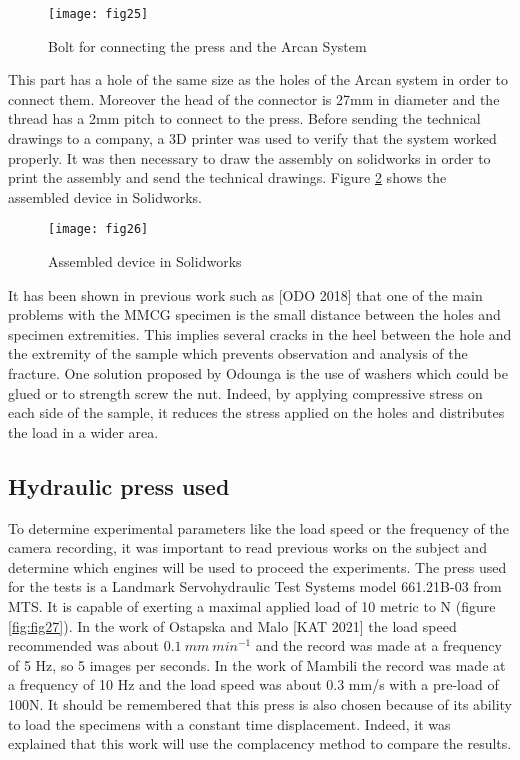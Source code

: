 \graphicspath{{Images/}}
\begin{figure}[htp]
	\centering
	\texttt{[image: fig25]}
	\caption{Bolt for connecting the press and the Arcan System}
	\label{fig:fig25}
\end{figure}

This part has a hole of the same size as the holes of the Arcan system in order to connect them. Moreover the head of the connector is 27mm in diameter and the thread has a 2mm pitch to connect to the press. Before sending the technical drawings to a company, a 3D printer was used to verify that the system worked properly. It was then necessary to draw the assembly on solidworks in order to print the assembly and send the technical drawings. Figure \ref{fig:fig26} shows the assembled device in Solidworks.

\graphicspath{{Images/}}
\begin{figure}[htp]
	\centering
	\texttt{[image: fig26]}
	\caption{Assembled device in Solidworks}
	\label{fig:fig26}
\end{figure}

It has been shown in previous work such as [ODO 2018] that one of the main problems with the MMCG specimen is the small distance between the holes and specimen extremities. This implies several cracks in the heel between the hole and the extremity of the sample which prevents observation and analysis of the fracture. One solution proposed by Odounga is the use of washers which could be glued or to strength screw the nut. Indeed, by applying compressive stress on each side of the sample, it reduces the stress applied on the holes and distributes the load in a wider area.

\subsection{Hydraulic press used}

To determine experimental parameters like the load speed or the frequency of the camera recording, it was important to read previous works on the subject and determine which engines will be used to proceed the experiments. The press used for the tests is a Landmark Servohydraulic Test Systems model 661.21B-03  from MTS. It is capable of exerting a maximal applied load of 10 metric to N (figure \ref{fig:fig27}).
In the work of Ostapska and Malo [KAT 2021] the load speed recommended was about $0.1\ mm\ {min}^{-1}$ and the record was made at a frequency of 5 Hz, so 5 images per seconds. In the work of Mambili the record was made at a frequency of 10 Hz and the load speed was about 0.3 mm/s with a pre-load of 100N. It should be remembered that this press is also chosen because of its ability to load the specimens with a constant time displacement. Indeed, it was explained that this work will use the complacency method to compare the results.

